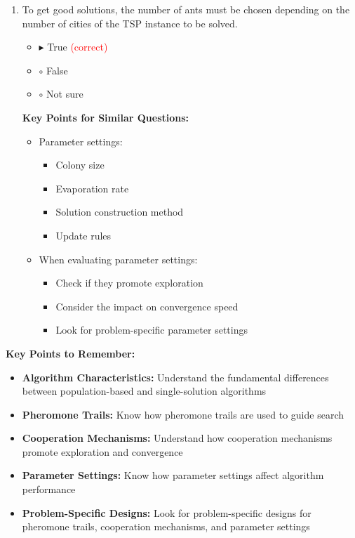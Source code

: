 \begin{enumerate}[label=\alph*)]
\item To get good solutions, the number of ants must be chosen depending on the number of cities of the TSP instance to be solved.
\begin{itemize}
\item $\blacktriangleright$ True \hspace{1em} \textcolor{red}{(correct)}
\item $\circ$ False
\item $\circ$ Not sure
\end{itemize}

\textbf{Key Points for Similar Questions:}
\begin{itemize}
\item Parameter settings:
  \begin{itemize}
  \item Colony size
  \item Evaporation rate
  \item Solution construction method
  \item Update rules
  \end{itemize}
\item When evaluating parameter settings:
  \begin{itemize}
  \item Check if they promote exploration
  \item Consider the impact on convergence speed
  \item Look for problem-specific parameter settings
  \end{itemize}
\end{itemize}
\end{enumerate}

\textbf{Key Points to Remember:}
\begin{itemize}
\item \textbf{Algorithm Characteristics:} Understand the fundamental differences between population-based and single-solution algorithms
\item \textbf{Pheromone Trails:} Know how pheromone trails are used to guide search
\item \textbf{Cooperation Mechanisms:} Understand how cooperation mechanisms promote exploration and convergence
\item \textbf{Parameter Settings:} Know how parameter settings affect algorithm performance
\item \textbf{Problem-Specific Designs:} Look for problem-specific designs for pheromone trails, cooperation mechanisms, and parameter settings
\end{itemize}

